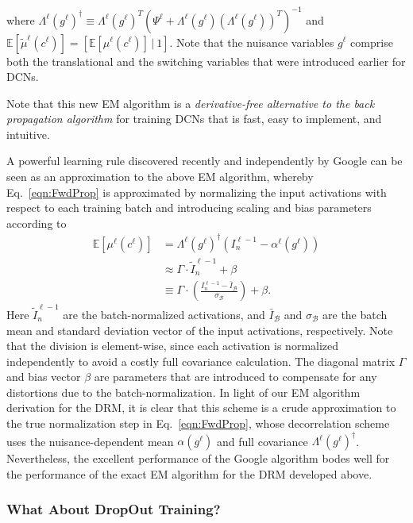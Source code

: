 \documentclass[12pt]{article}
\newcommand{\Expect}[0]{{ \mathbb{E} }}
\newcommand{\dg}[0]{{ \dagger }}
\begin{document}
where $\Lambda^{\ell}(g^{\ell})^{\dg} \equiv \Lambda^{\ell}(g^{\ell})^{T}(\Psi^{\ell}+\Lambda^{\ell}(g^{\ell})(\Lambda^{\ell}(g^{\ell}))^{T})^{-1}$ and $\Expect \left[ \tilde{\mu}^{\ell}(c^{\ell}) \right] = \left[\Expect \left[ \mu^{\ell}(c^{\ell}) \right] \,|\ 1\right]$. Note that the nuisance variables $g^{\ell}$ comprise both the translational and the switching variables that were introduced earlier for DCNs.

Note that this new EM algorithm is a \emph{derivative-free alternative to the back propagation algorithm} for training DCNs that is fast, easy to implement, and intuitive. 

A powerful learning rule discovered recently and independently by Google \cite{ioffe2015batch} can be seen as an approximation to the above EM algorithm, whereby Eq.~\ref{eqn:FwdProp} is approximated by normalizing the input activations with respect to each training batch and introducing scaling and bias parameters according to
\begin{align}
	\Expect \left[ \mu^{\ell}(c^{\ell}) \right] 
	    	&=  \Lambda^{\ell}(g^{\ell})^{\dg}(I^{\ell-1}_{n} - \alpha^{\ell}(g^{\ell})) \nonumber\\
		&\approx \Gamma \cdot \tilde{I}^{\ell-1}_n + \beta \nonumber\\
		&\equiv \Gamma \cdot \left( \frac{ I^{\ell-1}_n - \bar{I}_{\mathcal{B}} } {\sigma_{\mathcal{B}}} \right) + \beta.
\end{align}
Here $\tilde{I}^{\ell-1}_n$ are the batch-normalized activations, and $\bar{I}_{\mathcal{B}}$ and $\sigma_{\mathcal{B}}$ are the batch mean and standard deviation vector of the input activations, respectively. Note that the division is element-wise, since each activation is normalized independently to avoid a costly full covariance calculation. The diagonal matrix $\Gamma$ and bias vector $\beta$ are parameters that are introduced to compensate for any distortions due to the batch-normalization. 
%
In light of our EM algorithm derivation for the DRM, it is clear that this scheme is a crude approximation to the true normalization step in Eq.~\ref{eqn:FwdProp}, whose decorrelation scheme uses the nuisance-dependent mean $\alpha(g^{\ell})$ and full covariance $\Lambda^{\ell}(g^{\ell})^{\dg}$.
Nevertheless, the excellent performance of the Google algorithm bodes well for the performance of the exact EM algorithm for the DRM developed above.

\subsubsection{What About DropOut Training?} \label{sec:DropOut}
\end{document}
